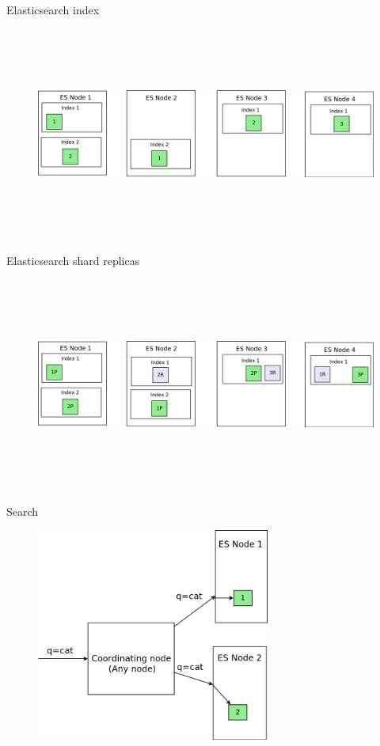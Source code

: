 \documentclass{beamer}
\begin{document}
\begin{frame}{Elasticsearch index}
	\begin{figure}
		\includegraphics[width=\textwidth,height=7cm,keepaspectratio=true]{elasticsearch-more-nodes}
	\end{figure}
\end{frame}
\begin{frame}{Elasticsearch shard replicas}
	\begin{figure}
		\includegraphics[width=\textwidth,height=7cm,keepaspectratio=true]{elasticsearch-shard-replicas}
	\end{figure}
\end{frame}
\begin{frame}{Search}
	\begin{figure}
		\includegraphics[width=\textwidth,height=7cm,keepaspectratio=true]{search1}
	\end{figure}
\end{frame}
\end{document}
